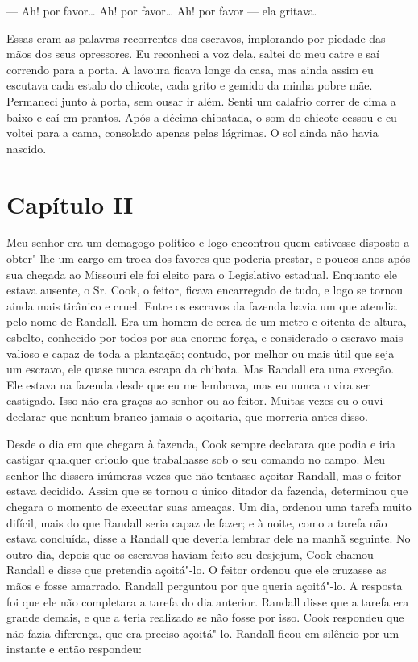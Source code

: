 --- Ah! por favor\ldots{} Ah! por favor\ldots{} Ah! por favor --- ela
gritava.

Essas eram as palavras recorrentes dos escravos, implorando por piedade
das mãos dos seus opressores. Eu reconheci a voz dela, saltei do meu
catre e saí correndo para a porta. A lavoura ficava longe da casa, mas
ainda assim eu escutava cada estalo do chicote, cada grito e gemido da
minha pobre mãe. Permaneci junto à porta, sem ousar ir além. Senti um
calafrio correr de cima a baixo e caí em prantos. Após a décima
chibatada, o som do chicote cessou e eu voltei para a cama, consolado
apenas pelas lágrimas. O sol ainda não havia nascido.

\chapter{Capítulo II}

Meu senhor era um demagogo político e logo encontrou quem estivesse
disposto a obter"-lhe um cargo em troca dos favores que poderia prestar,
e poucos anos após sua chegada ao Missouri ele foi eleito para o
Legislativo estadual. Enquanto ele estava ausente, o Sr. Cook, o feitor,
ficava encarregado de tudo, e logo se tornou ainda mais tirânico e
cruel. Entre os escravos da fazenda havia um que atendia pelo nome de
Randall. Era um homem de cerca de um metro e oitenta de altura, esbelto,
conhecido por todos por sua enorme força, e considerado o escravo mais
valioso e capaz de toda a plantação; contudo, por melhor ou mais útil
que seja um escravo, ele quase nunca escapa da chibata. Mas Randall era
uma exceção. Ele estava na fazenda desde que eu me lembrava, mas eu
nunca o vira ser castigado. Isso não era graças ao senhor ou ao feitor.
Muitas vezes eu o ouvi declarar que nenhum branco jamais o açoitaria,
que morreria antes disso.

Desde o dia em que chegara à fazenda, Cook sempre declarara que podia e
iria castigar qualquer crioulo que trabalhasse sob o seu comando no
campo. Meu senhor lhe dissera inúmeras vezes que não tentasse açoitar
Randall, mas o feitor estava decidido. Assim que se tornou o único
ditador da fazenda, determinou que chegara o momento de executar suas
ameaças. Um dia, ordenou uma tarefa muito difícil, mais do que Randall
seria capaz de fazer; e à noite, como a tarefa não estava concluída,
disse a Randall que deveria lembrar dele na manhã seguinte. No outro
dia, depois que os escravos haviam feito seu desjejum, Cook chamou
Randall e disse que pretendia açoitá"-lo. O feitor ordenou que ele
cruzasse as mãos e fosse amarrado. Randall perguntou por que queria
açoitá"-lo. A resposta foi que ele não completara a tarefa do dia
anterior. Randall disse que a tarefa era grande demais, e que a teria
realizado se não fosse por isso. Cook respondeu que não fazia diferença,
que era preciso açoitá"-lo. Randall ficou em silêncio por um instante e
então respondeu:

